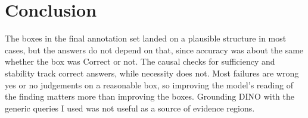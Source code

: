 \documentclass[11pt]{article}
\begin{document}
\section{Conclusion}
The boxes in the final annotation set landed on a plausible structure in most cases, but the answers do not depend on that, since accuracy
was about the same whether the box was Correct or not. The causal checks for sufficiency and stability track correct answers, while necessity
does not. Most failures are wrong yes or no judgements on a reasonable box, so improving the model's reading of the finding matters more than
improving the boxes. Grounding DINO with the generic queries I used was not useful as a source of evidence regions.
\end{document}
